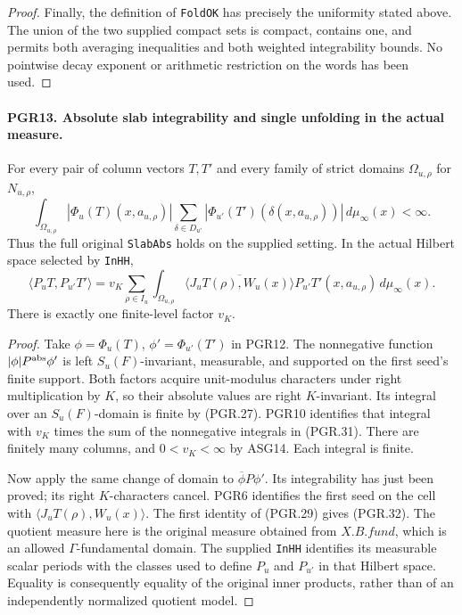 \documentclass[11pt,a4paper]{article}
\numberwithin{equation}{section}
\theoremstyle{remark}\newtheorem{remark}[theorem]{Remark}
\begin{document}
\begin{proof}
Finally, the definition of \texttt{Fold\allowbreak OK} has precisely the
uniformity stated above.  The union of the two supplied compact sets
is compact, contains one, and permits both averaging inequalities and
both weighted integrability bounds.  No pointwise decay exponent or
arithmetic restriction on the words has been used.
\end{proof}

\paragraph{PGR13. Absolute slab integrability and single unfolding in the actual measure.}
\label{claim:PGR13}
For every pair of column vectors \(T,T'\) and every family of
strict domains \(\Omega_{u,\rho}\) for \(N_{u,\rho}\),
\[
 \int_{\Omega_{u,\rho}}|\Phi_u(T)(x,a_{u,\rho})|
       \sum_{\delta\in D_{u'}}
          |\Phi_{u'}(T')(\delta(x,a_{u,\rho}))|
                     \,d\mu_\infty(x)<\infty.
\tag{PGR.31}
\]
Thus the full original \texttt{Slab\allowbreak Abs} holds on the supplied
setting.  In the actual Hilbert space selected by \texttt{In\allowbreak HH},
\[
 \langle P_uT,P_{u'}T'\rangle
   =v_K\sum_{\rho\in I_u}\int_{\Omega_{u,\rho}}
       \overline{\langle J_uT(\rho),W_u(x)\rangle}
          P_{u'}T'(x,a_{u,\rho})\,d\mu_\infty(x).
\tag{PGR.32}
\]
There is exactly one finite-level factor \(v_K\).
\begin{proof}
Take \(\phi=\Phi_u(T)\), \(\phi'=\Phi_{u'}(T')\)
in PGR12.  The nonnegative function
\(|\phi|P^{\rm abs}\phi'\) is left \(S_u(F)\)-invariant,
measurable, and supported on the first seed's finite support.  Both
factors acquire unit-modulus characters under right multiplication by
\(K\), so their absolute values are right \(K\)-invariant.
Its integral over an \(S_u(F)\)-domain is finite by (PGR.27).
PGR10 identifies that integral with \(v_K\) times the sum of
the nonnegative integrals in (PGR.31).  There are finitely many columns,
and \(0<v_K<\infty\) by ASG14.  Each integral is finite.

Now apply the same change of domain to
\(\overline{\phi}P\phi'\).  Its integrability has just been
proved; its right \(K\)-characters cancel.  PGR6 identifies the
first seed on the cell with
\(\langle J_uT(\rho),W_u(x)\rangle\).
The first identity of (PGR.29) gives (PGR.32).  The quotient measure
here is the original measure obtained from \(X.B.fund\), which is
an allowed \(\Gamma\)-fundamental domain.  The supplied
\texttt{In\allowbreak HH} identifies its measurable scalar periods with the
classes used to define \(P_u\) and \(P_{u'}\) in that Hilbert
space.  Equality is consequently equality of the original inner
products, rather than of an independently normalized quotient model.
\end{proof}
\end{document}
